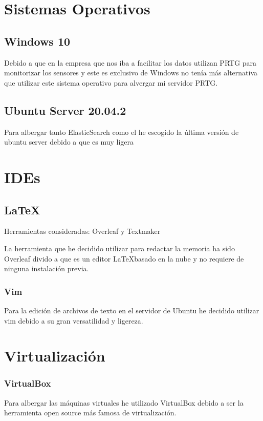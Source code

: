 \section{Sistemas Operativos}

\subsection{Windows 10}
Debido a que en la empresa que nos iba a facilitar los datos utilizan PRTG para monitorizar los sensores y este es exclusivo de Windows no tenía más alternativa que utilizar este sistema operativo para alvergar mi servidor PRTG.

\subsection{Ubuntu Server 20.04.2}
Para albergar tanto ElasticSearch como el he escogido la última versión de ubuntu server debido a que es muy ligera 
\section{IDEs}

\subsection{\LaTeX}

Herramientas consideradas: Overleaf y Textmaker

La herramienta que he decidido utilizar para redactar la memoria ha sido Overleaf divido a que es un editor \LaTeX basado en la nube y no requiere de ninguna instalación previa.

\subsubsection{Vim}
Para la edición de archivos de texto en el servidor de Ubuntu he decidido utilizar vim debido a su gran versatilidad y ligereza.

\section{Virtualización}

\subsubsection{VirtualBox}
Para albergar las máquinas virtuales he utilizado VirtualBox debido a ser la herramienta open source más famosa de virtualización.

